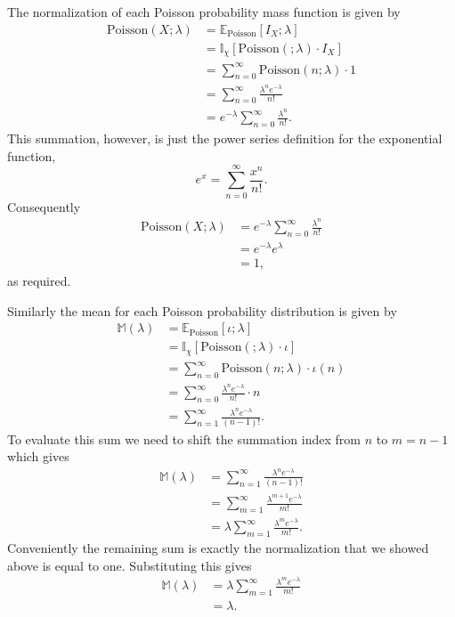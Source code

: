\documentclass[
  letterpaper,
  DIV=11,
  numbers=noendperiod]{scrartcl}
\begin{document}
The normalization of each Poisson probability mass function is given by
\begin{align*}
\mathrm{Poisson}(X; \lambda)
&= \mathbb{E}_{\mathrm{Poisson}}[ I_{X}; \lambda ]
\\
&= \mathbb{I}_{\chi}[ \mathrm{Poisson}( ; \lambda) \cdot I_{X} ]
\\
&= \sum_{n = 0}^{\infty} \mathrm{Poisson}(n; \lambda) \cdot 1
\\
&= \sum_{n = 0}^{\infty} \frac{ \lambda^{n} e^{-\lambda} }{ n! }
\\
&= e^{-\lambda} \sum_{n = 0}^{\infty} \frac{ \lambda^{n} }{ n! }.
\end{align*} This summation, however, is just the power series
definition for the exponential function, \[
e^{x} = \sum_{n = 0}^{\infty} \frac{ x^{n} }{ n! }.
\] Consequently \begin{align*}
\mathrm{Poisson}(X; \lambda)
&= e^{-\lambda} \sum_{n = 0}^{\infty} \frac{ \lambda^{n} }{ n! }
\\
&= e^{-\lambda} e^{\lambda}
\\
&= 1,
\end{align*} as required.

Similarly the mean for each Poisson probability distribution is given by
\begin{align*}
\mathbb{M}(\lambda)
&= \mathbb{E}_{\mathrm{Poisson}} [ \iota ; \lambda ]
\\
&= \mathbb{I}_{\chi} [ \mathrm{Poisson}( ; \lambda) \cdot \iota ]
\\
&= \sum_{n = 0}^{\infty} \mathrm{Poisson}(n; \lambda) \cdot \iota(n)
\\
&= \sum_{n = 0}^{\infty} \frac{ \lambda^{n} e^{-\lambda} }{ n! } \cdot n
\\
&= \sum_{n = 1}^{\infty} \frac{ \lambda^{n} e^{-\lambda} }{ (n - 1)! }.
\end{align*} To evaluate this sum we need to shift the summation index
from \(n\) to \(m = n - 1\) which gives \begin{align*}
\mathbb{M}(\lambda)
&= \sum_{n = 1}^{\infty} \frac{ \lambda^{n} e^{-\lambda} }{ (n - 1)! }
\\
&= \sum_{m = 1}^{\infty} \frac{ \lambda^{m + 1} e^{-\lambda} }{ m! }
\\
&= \lambda \sum_{m = 1}^{\infty} \frac{ \lambda^{m} e^{-\lambda} }{ m! }.
\end{align*} Conveniently the remaining sum is exactly the normalization
that we showed above is equal to one. Substituting this gives
\begin{align*}
\mathbb{M}(\lambda)
&= \lambda \sum_{m = 1}^{\infty} \frac{ \lambda^{m} e^{-\lambda} }{ m! }
\\
&= \lambda.
\end{align*}
\end{document}
